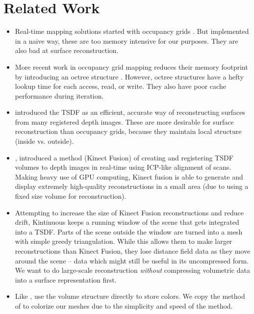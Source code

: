\documentclass[conference,10pt]{IEEEtran}
\begin{document}
\section{Related Work}
\begin{itemize}
    \item Real-time mapping solutions started with occupancy grids
    \cite{Elfes1989}. But implemented in a naive way, these are too memory
    intensive for our purposes. They are also bad at surface reconstruction.
    \item More recent work in occupancy grid mapping reduces their memory
    footprint by introducing an octree structure \cite{Wurm2010}. However,
    octree structures have a hefty lookup time for each access, read, or write.
    They also have poor cache performance during iteration.
    \item \cite{Curless1996} introduced the TSDF as an efficient, accurate way
    of reconstructing surfaces from many registered depth images. These are more
    desirable for surface reconstruction than occupancy grids, because they
    maintain local structure (inside vs. outside).
    \item \cite{Newcombe}, introduced a method (Kinect Fusion) of creating and
    registering TSDF volumes to depth images in real-time using ICP-like alignment of scans.
    Making heavy use of GPU computing, Kinect fusion is able to generate and
    display extremely high-quality reconstructions in a small area (due to
    using a fixed size volume for reconstruction). 
    \item Attempting to increase the size of Kinect Fusion reconstructions and
    reduce drift, Kintinuous \cite{Whelan2013} keeps a running window of the
    scene that gets integrated into a TSDF. Parts of the scene outside the
    window are turned into a mesh with simple greedy triangulation. While this
    allows them to make larger reconstructions than Kinect Fusion, they lose
    distance field data as they move around the scene -- data which might still
    be useful in its uncompressed form. We want to do large-scale reconstruction
    \emph{without} compressing volumetric data into a surface representation
    first.
    \item Like \cite{Whelan2013}, \cite{Bylow2013} use the volume structure
    directly to store colors. We copy the method of \cite{Bylow2013} to colorize
    our meshes due to the simplicity and speed of the method.
\end{itemize}
\end{document}
